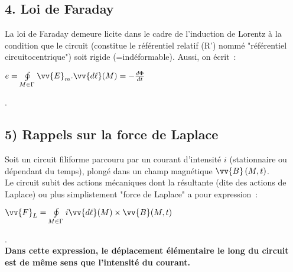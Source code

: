 \documentclass{article}
\newcommand{\mathcolorbox}[2]{\colorbox{#1}{$#2$}}
\let\oldoint\oint
\renewcommand{\oint}{\oldoint\limits}
\renewcommand\overrightarrow{\vv}
\begin{document}
\subsection*{4. Loi de Faraday}
La loi de Faraday demeure licite dans le cadre de
l'induction de Lorentz à la condition que le circuit (constitue le
référentiel relatif (R') nommé "référentiel circuitocentrique") soit
rigide (=indéformable). Aussi, on écrit : \\
\centerline{\mathcolorbox{gray!20}{e=\oint_{M \in
\Gamma}\overrightarrow{E}_{m}.\overrightarrow{d\ell}(M) =
-\frac{d\Phi}{dt}}}.

\subsection*{5)  Rappels sur la force de Laplace}
Soit un circuit filiforme parcouru par un courant
d'intensité $i$ (stationnaire ou dépendant du temps), plongé dans un
champ
magnétique $\overrightarrow{B}\left(M,t\right)$. \\
Le circuit subit des actions mécaniques dont la résultante (dite des
actions de Laplace) ou plus simplistement "force de Laplace" a pour
expression : \\
\centerline{\mathcolorbox{gray!20}{\overrightarrow{F}_{L} = \oint_{M \in
\Gamma}i\overrightarrow{d\ell}(M) \times \overrightarrow{B}(M,t)}}.
\\
\textbf{Dans cette expression, le déplacement élémentaire le long du
circuit est de même sens que l'intensité du courant.}
\end{document}
